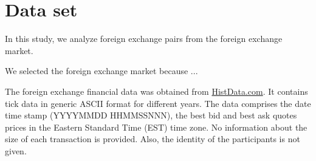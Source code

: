 \section{Data set}\label{sec:data_set}

In this study, we analyze foreign exchange pairs from the foreign exchange market.

We selected the foreign exchange market because ...

The foreign exchange financial data was obtained from
\href{www.histdata.com}{HistData.com}. It contains tick data in generic ASCII
format for different years. The data comprises the date time stamp (YYYYMMDD HHMMSSNNN),
the best bid and best ask quotes prices in the Eastern Standard Time (EST) time zone.
No information about the size of each transaction is provided. Also, the
identity of the participants is not given.


